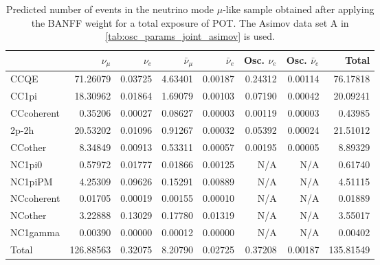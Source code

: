 \begin{table}
\center
\begin{tabular} { | l ||r | r | r | r | r | r | | r | }
\hline
              & $\nu_\mu$            & $\nu_e$              & $\bar{\nu}_{\mu}$    & $\bar{\nu}_{e}$      & Osc. $\nu_e$         & Osc. $\bar{\nu}_{e}$ & Total                \\ \hline\hline
 CCQE         & 71.26079             & 0.03725              & 4.63401              & 0.00187              & 0.24312              & 0.00114              & 76.17818             \\ \hline
 CC1pi        & 18.30962             & 0.01864              & 1.69079              & 0.00103              & 0.07190              & 0.00042              & 20.09241             \\ \hline
 CCcoherent   & 0.35206              & 0.00027              & 0.08627              & 0.00003              & 0.00119              & 0.00003              & 0.43985              \\ \hline
 2p-2h        & 20.53202             & 0.01096              & 0.91267              & 0.00032              & 0.05392              & 0.00024              & 21.51012             \\ \hline
 CCother      & 8.34849              & 0.00913              & 0.53311              & 0.00057              & 0.00195              & 0.00005              & 8.89329              \\ \hline
 NC1pi0       & 0.57972              & 0.01777              & 0.01866              & 0.00125              & N/A                  & N/A                  & 0.61740              \\ \hline
 NC1piPM      & 4.25309              & 0.09626              & 0.15291              & 0.00889              & N/A                  & N/A                  & 4.51115              \\ \hline
 NCcoherent   & 0.01705              & 0.00019              & 0.00155              & 0.00010              & N/A                  & N/A                  & 0.01889              \\ \hline
 NCother      & 3.22888              & 0.13029              & 0.17780              & 0.01319              & N/A                  & N/A                  & 3.55017              \\ \hline
 NC1gamma     & 0.00390              & 0.00000              & 0.00012              & 0.00000              & N/A                  & N/A                  & 0.00402              \\ \hline
\hline
 Total        & 126.88563            & 0.32075              & 8.20790              & 0.02725              & 0.37208              & 0.00187              & 135.81549            \\ \hline
\end{tabular}
\caption{
Predicted number of events in the neutrino mode $\mu$-like sample
obtained after applying the BANFF weight
for a total exposure of \TotalPotNuRunOneSevenC{} POT.
The Asimov data set A in \cref{tab:osc_params_joint_asimov} is used.
}
\label{tab:events_1rmu_Asimov_A}
\end{table}


